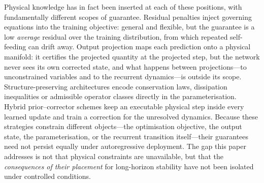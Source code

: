 \documentclass[11pt,a4paper]{article}
\begin{document}
Physical knowledge has in fact been inserted at each of these positions, with fundamentally different scopes of guarantee. Residual penalties inject governing equations into the training objective\cite{raissi2019pinn,karniadakis2021,li2024pino,wang2021pideeponet,zanardi2023adaptive}: general and flexible, but the guarantee is a low \emph{average} residual over the training distribution, from which repeated self-feeding can drift away. Output projection maps each prediction onto a physical manifold\cite{valente2025projection}: it certifies the projected quantity at the projected step, but the network never sees its own corrected state, and what happens between projections---to unconstrained variables and to the recurrent dynamics---is outside its scope. Structure-preserving architectures encode conservation laws, dissipation inequalities or admissible operator classes directly in the parameterisation\cite{rao2023percnn,mohan2023hard,lee2021deepconservation,chen2024onsagernet,xiong2026pdco,chalapathi2024moe}. Hybrid prior--corrector schemes keep an executable physical step inside every learned update and train a correction for the unresolved dynamics\cite{wang2026ani,yin2021aphynity}. Because these strategies constrain different objects---the optimisation objective, the output state, the parameterisation, or the recurrent transition itself---their guarantees need not persist equally under autoregressive deployment. The gap this paper addresses is not that physical constraints are unavailable, but that the \emph{consequences of their placement} for long-horizon stability have not been isolated under controlled conditions.
\end{document}
